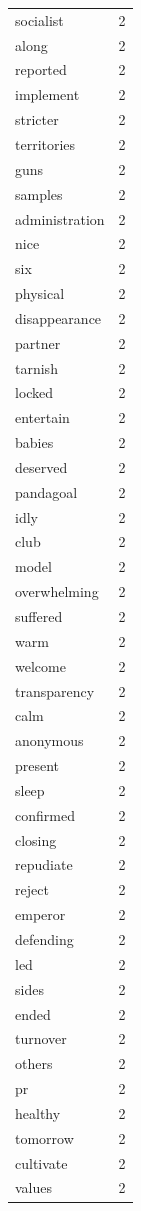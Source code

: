 \begin{tabular}{lr}
socialist & 2 \\
along & 2 \\
reported & 2 \\
implement & 2 \\
stricter & 2 \\
territories & 2 \\
guns & 2 \\
samples & 2 \\
administration & 2 \\
nice & 2 \\
six & 2 \\
physical & 2 \\
disappearance & 2 \\
partner & 2 \\
tarnish & 2 \\
locked & 2 \\
entertain & 2 \\
babies & 2 \\
deserved & 2 \\
pandagoal & 2 \\
idly & 2 \\
club & 2 \\
model & 2 \\
overwhelming & 2 \\
suffered & 2 \\
warm & 2 \\
welcome & 2 \\
transparency & 2 \\
calm & 2 \\
anonymous & 2 \\
present & 2 \\
sleep & 2 \\
confirmed & 2 \\
closing & 2 \\
repudiate & 2 \\
reject & 2 \\
emperor & 2 \\
defending & 2 \\
led & 2 \\
sides & 2 \\
ended & 2 \\
turnover & 2 \\
others & 2 \\
pr & 2 \\
healthy & 2 \\
tomorrow & 2 \\
cultivate & 2 \\
values & 2 \\

\end{tabular}
